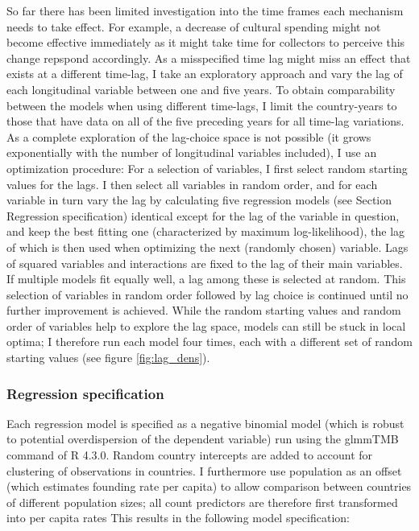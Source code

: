\documentclass[11pt]{article}
\begin{document}
So far there has been limited investigation into the time frames each mechanism needs to take effect.
For example, a decrease of cultural spending might not become effective immediately as it might take time for collectors to perceive this change repspond accordingly.
As a misspecified time lag might miss an effect that exists at a different time-lag, I take an exploratory approach and vary the lag of each longitudinal variable between one and five years.
To obtain comparability between the models when using different time-lags, I limit the country-years to those that have data on all of the five preceding years for all time-lag variations.
As a complete exploration of the lag-choice space is not possible (it grows exponentially with the number of longitudinal variables included), I use an optimization procedure:
For a selection of variables, I first select random starting values for the lags.
I then select all variables in random order, and for each variable in turn vary the lag by calculating five regression models (see Section Regression specification) identical except for the lag of the variable in question, and keep the best fitting one (characterized by maximum log-likelihood), the lag of which is then used when optimizing the next (randomly chosen) variable.
Lags of squared variables and interactions are fixed to the lag of their main variables.
If multiple models fit equally well, a lag among these is selected at random.
This selection of variables in random order followed by lag choice is continued until no further improvement is achieved.
While the random starting values and random order of variables help to explore the lag space, models can still be stuck in local optima; I therefore run each model four times, each with a different set of random starting values (see figure \ref{fig:lag_dens}). 



\subsubsection*{Regression specification}

Each regression model is specified as a negative binomial model (which is robust to potential overdispersion of the dependent variable) run using the glmmTMB command \parencite{Brooks_etal_2017_glmmTMB} of R 4.3.0. 
Random country intercepts are added to account for clustering of observations in countries.
I furthermore use population as an offset (which estimates founding rate per capita) to allow comparison between countries of different population sizes; all count predictors are therefore first transformed into per capita rates
This results in the following model specification:
\end{document}
